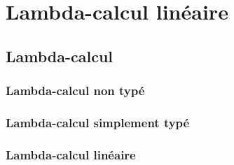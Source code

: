 %
\chapter{Lambda-calcul linéaire}
\label{sec::chapitre3}

\section{Lambda-calcul}
\subsection{Lambda-calcul non typé}
\subsection{Lambda-calcul simplement typé}
\subsection{Lambda-calcul linéaire}
